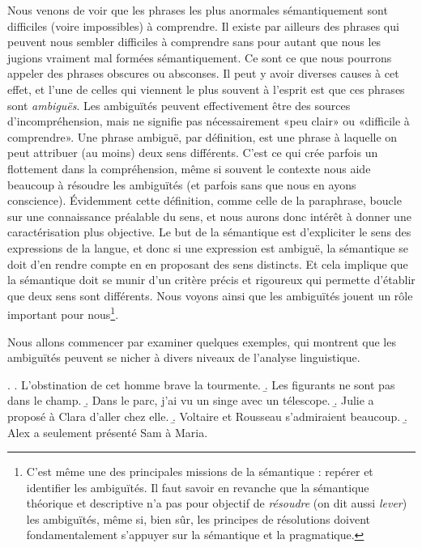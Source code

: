 \begin{refsegment}
Nous venons de voir que les phrases les plus anormales sémantiquement sont difficiles (voire impossibles) à comprendre.   Il existe par ailleurs des phrases qui peuvent nous sembler difficiles à comprendre sans pour autant que nous les jugions vraiment mal formées sémantiquement.  Ce sont ce que nous pourrons appeler des phrases obscures ou absconses. Il peut y avoir diverses causes à cet effet, et l'une de celles qui viennent le plus souvent à l'esprit est que ces phrases sont \emph{ambiguës}.  
Les ambiguïtés peuvent effectivement être des sources d'incompréhension, mais  ne signifie pas nécessairement «peu clair» ou «difficile à comprendre».  Une phrase ambiguë, par définition, est une phrase à laquelle on peut attribuer (au moins) deux sens différents.  
C'est ce qui crée parfois un flottement dans la compréhension, même si souvent le contexte nous aide beaucoup à résoudre les ambiguïtés (et parfois sans que nous en ayons conscience).
Évidemment cette définition, comme celle de la paraphrase, boucle sur une connaissance préalable  du sens, et nous aurons donc intérêt à donner une caractérisation plus objective.  
Le but de la sémantique est d'expliciter le sens des expressions de la langue, et donc si une expression est ambiguë, la sémantique se doit d'en rendre compte en en proposant des sens distincts. 
Et cela implique que la sémantique doit se munir d'un critère précis et rigoureux qui permette d'établir que deux sens sont différents.  Nous voyons ainsi que les ambiguïtés jouent un rôle important pour nous\footnote{C'est même une des principales missions de la sémantique : repérer et identifier les ambiguïtés. Il faut savoir en revanche que la sémantique théorique et descriptive n'a pas pour objectif de \emph{résoudre} (on dit aussi \emph{lever}) les ambiguïtés, même si, bien sûr, les principes de résolutions doivent fondamentalement s'appuyer sur la sémantique et la pragmatique.}.  


Nous allons commencer par examiner quelques exemples, qui montrent que les ambiguïtés peuvent se nicher à divers niveaux de l'analyse linguistique. 



\ex.
\a. L'obstination de cet homme brave la tourmente. \label{x:amb1}
\b. Les figurants ne sont pas dans le champ. \label{x:amb2}
\b. Dans le parc, j'ai vu un singe avec un télescope. \label{x:telescope}
\b. Julie a proposé à Clara d'aller chez elle. \label{x:amb3}
\b. Voltaire et Rousseau s'admiraient beaucoup. \label{x:amb4}
\b. Alex a seulement présenté Sam à Maria. \label{x:amb5}



\end{refsegment}
